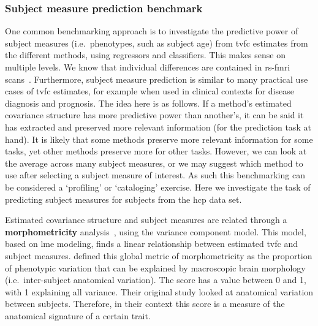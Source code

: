 \subsubsection{Subject measure prediction benchmark}

One common benchmarking approach is to investigate the predictive power of subject measures (i.e.~phenotypes, such as subject age) from \gls{tvfc} estimates from the different methods, using regressors and classifiers.
This makes sense on multiple levels.
We know that individual differences are contained in \gls{rs-fmri} scans~\parencite{Finn2015}.
Furthermore, subject measure prediction is similar to many practical use cases of \gls{tvfc} estimates, for example when used in clinical contexts for disease diagnosis and prognosis.
%
The idea here is as follows.
If a method's estimated covariance structure has more predictive power than another's, it can be said it has extracted and preserved more relevant information (for the prediction task at hand).
It is likely that some methods preserve more relevant information for some tasks, yet other methods preserve more for other tasks.
However, we can look at the average across many subject measures, or we may suggest which method to use after selecting a subject measure of interest.
As such this benchmarking can be considered a `profiling' or `cataloging' exercise.
Here we investigate the task of predicting subject measures for subjects from the \gls{hcp} data set.

Estimated covariance structure and subject measures are related through a \textbf{morphometricity} analysis~\parencite{Sabuncu2016}, using the variance component model.
This model, based on \gls{lme} modeling, finds a linear relationship between estimated \gls{tvfc} and subject measures.
\textcite{Sabuncu2016} defined this global metric of morphometricity as the proportion of phenotypic variation that can be explained by macroscopic brain morphology (i.e.~inter-subject anatomical variation).
The score has a value between 0 and 1, with 1 explaining all variance.
Their original study looked at anatomical variation between subjects.
Therefore, in their context this score is a measure of the anatomical signature of a certain trait.

